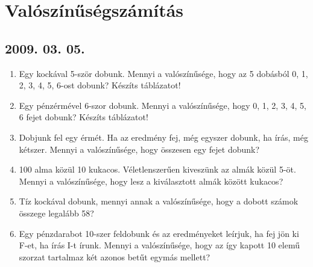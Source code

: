 \documentclass{article}
\begin{document}
\section*{Valószínűségszámítás}

\subsection*{2009. 03. 05.}
\begin{enumerate}
\item Egy kockával 5-ször dobunk. Mennyi a valószínűsége, hogy az 5 dobásból 0, 1, 2, 3, 4, 5, 6-ost dobunk? Készíts táblázatot!

\item Egy pénzérmével 6-szor dobunk. Mennyi a valószínűsége, hogy 0, 1, 2, 3, 4, 5, 6 fejet dobunk? Készíts táblázatot!

\item Dobjunk fel egy érmét. Ha az eredmény fej, még egyszer dobunk, ha írás, még kétszer. Mennyi a valószínűsége, hogy összesen egy fejet dobunk?

\item 100 alma közül 10 kukacos. Véletlenszerűen kiveszünk az almák közül 5-öt. Mennyi a valószínűsége, hogy lesz a kiválasztott almák között kukacos?

\item Tíz kockával dobunk, mennyi annak a valószínűsége, hogy a dobott számok összege legalább 58?

\item Egy pénzdarabot 10-szer feldobunk és az eredményeket leírjuk, ha fej jön ki F-et, ha írás I-t írunk. Mennyi a valószínűsége, hogy az így kapott 10 elemű szorzat tartalmaz két azonos betűt egymás mellett?
\end{enumerate}
\end{document}
